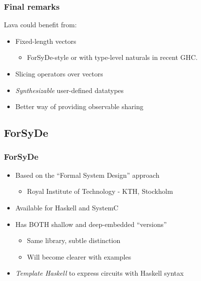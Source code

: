         \begin{frame}
            \frametitle{Final remarks}

            \par{Lava could benefit from:}
            \vspace{0.2cm}
            \begin{itemize}
                \item Fixed-length vectors
                    \begin{itemize}
                        \item ForSyDe-style or with type-level naturals in recent GHC.
                    \end{itemize}
                \item Slicing operators over vectors
                \item \emph{Synthesizable} user-defined datatypes
                \item Better way of providing observable sharing
            \end{itemize}
        \end{frame}


    \subsection{ForSyDe}
    \label{subsec:forsyde}
        \begin{frame}
            \frametitle{ForSyDe}

            \begin{itemize}
                \item Based on the ``Formal System Design'' approach
                    \begin{itemize}
                        \item Royal Institute of Technology - KTH, Stockholm
                    \end{itemize}
                \item Available for Haskell and SystemC
                \item Has BOTH shallow and deep-embedded ``versions''
                    \begin{itemize}
                        \item Same library, subtle distinction
                        \item Will become clearer with examples
                    \end{itemize}
                \item \emph{Template Haskell} to express circuits with Haskell syntax
            \end{itemize}
        \end{frame}

